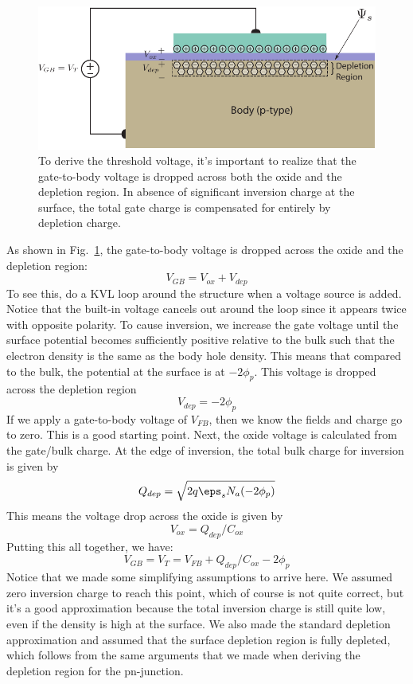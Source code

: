 \begin{figure}[tbh]
\begin{center}
\includegraphics[width=.75\columnwidth]{mos_cap_threshold}
\end{center}
\caption{To derive the threshold voltage, it's important to realize that the gate-to-body voltage is dropped across both the oxide and the depletion region.  In absence of significant inversion charge at the surface, the total gate charge is compensated for entirely by depletion charge. } \label{fig:mos_vt_derive}
\end{figure} 

As shown in Fig.~\ref{fig:mos_vt_derive}, the gate-to-body voltage is dropped across the oxide and the depletion region:
%
\begin{equation}
   V_{GB} = V_{ox} + V_{dep}
\end{equation}
%
To see this, do a KVL loop around the structure when a voltage source is added.   Notice that the built-in voltage cancels out around the loop since it appears twice with opposite polarity.   To cause inversion, we increase the gate voltage until the surface potential becomes sufficiently positive relative to the bulk such that the electron density is the same as the body hole density.  This means that compared to the bulk, the potential at the surface is at $-2\phi_p$.  This voltage is dropped across the depletion region
\begin{equation}
	V_{dep} = -2 \phi_p
\end{equation}
%
If we apply a gate-to-body voltage of $V_{FB}$, then we know the fields and charge go to zero. This is a good starting point.  Next, the oxide voltage is calculated from the gate/bulk charge.  At the edge of inversion, the total bulk charge for inversion is given by 
%
\begin{equation}
	Q_{dep} = \sqrt{2 q \eps_s N_a (-2 \phi_p) }
\end{equation}
%
This means the voltage drop across the oxide is given by
%
\begin{equation}
	V_{ox} = Q_{dep} / C_{ox} 
\end{equation}
%
Putting this all together, we have:
%
\begin{equation}
	V_{GB} = V_T = V_{FB} + Q_{dep}/C_{ox} - 2 \phi_p
\end{equation}
%
Notice that we made some simplifying assumptions to arrive here.  We assumed zero inversion charge to reach this point, which of course is not quite correct, but it's a good approximation because the total inversion charge is still quite low, even if the density is high at the surface.  We also made the standard depletion approximation and assumed that the surface depletion region is fully depleted, which follows from the same arguments that we made when deriving the depletion region for the pn-junction.


